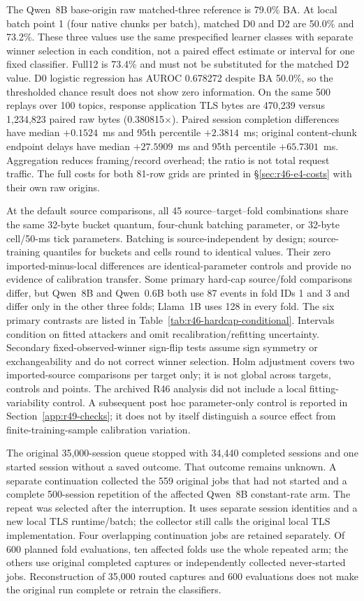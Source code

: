 The Qwen~8B base-origin raw matched-three reference is 79.0\% BA. At local batch point 1 (four native chunks per batch), matched D0 and D2 are 50.0\% and 73.2\%. These three values use the same prespecified learner classes with separate winner selection in each condition, not a paired effect estimate or interval for one fixed classifier. Full12 is 73.4\% and must not be substituted for the matched D2 value. D0 logistic regression has AUROC 0.678272 despite BA 50.0\%, so the thresholded chance result does not show zero information. On the same 500 replays over 100 topics, response application TLS bytes are 470,239 versus 1,234,823 paired raw bytes (0.380815$\times$). Paired session completion differences have median $+0.1524$~ms and 95th percentile $+2.3814$~ms; original content-chunk endpoint delays have median $+27.5909$~ms and 95th percentile $+65.7301$~ms. Aggregation reduces framing/record overhead; the ratio is not total request traffic. The full costs for both 81-row grids are printed in \S\ref{sec:r46-e4-costs} with their own raw origins.

At the default source comparisons, all 45 source--target--fold combinations share the same 32-byte bucket quantum, four-chunk batching parameter, or 32-byte cell/50-ms tick parameters. Batching is source-independent by design; source-training quantiles for buckets and cells round to identical values. Their zero imported-minus-local differences are identical-parameter controls and provide no evidence of calibration transfer. Some primary hard-cap source/fold comparisons differ, but Qwen~8B and Qwen~0.6B both use 87 events in fold IDs 1 and 3 and differ only in the other three folds; Llama~1B uses 128 in every fold. The six primary contrasts are listed in Table~\ref{tab:r46-hardcap-conditional}. Intervals condition on fitted attackers and omit recalibration/refitting uncertainty. Secondary fixed-observed-winner sign-flip tests assume sign symmetry or exchangeability and do not correct winner selection. Holm adjustment covers two imported-source comparisons per target only; it is not global across targets, controls and points. The archived R46 analysis did not include a local fitting-variability control. A subsequent post hoc parameter-only control is reported in Section~\ref{app:r49-checks}; it does not by itself distinguish a source effect from finite-training-sample calibration variation.

The original 35,000-session queue stopped with 34,440 completed sessions and one started session without a saved outcome. That outcome remains unknown. A separate continuation collected the 559 original jobs that had not started and a complete 500-session repetition of the affected Qwen~8B constant-rate arm. The repeat was selected after the interruption. It uses separate session identities and a new local TLS runtime/batch; the collector still calls the original local TLS implementation. Four overlapping continuation jobs are retained separately. Of 600 planned fold evaluations, ten affected folds use the whole repeated arm; the others use original completed captures or independently collected never-started jobs. Reconstruction of 35,000 routed captures and 600 evaluations does not make the original run complete or retrain the classifiers.

